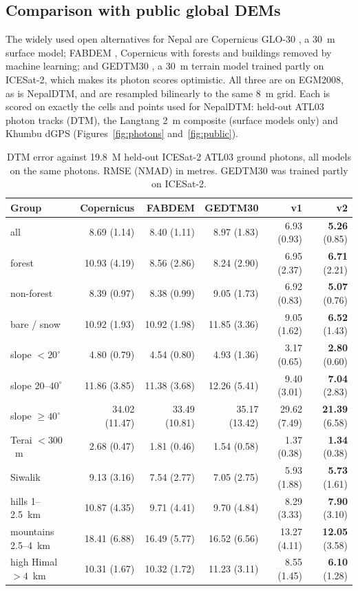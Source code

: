 \documentclass[11pt]{article}
\begin{document}
\subsection{Comparison with public global DEMs}
The widely used open alternatives for Nepal are Copernicus GLO-30 \citep{esa2021copernicus}, a 30~m surface
model; FABDEM \citep{hawker2022fabdem}, Copernicus with forests and buildings removed by machine learning; and
GEDTM30 \citep{ho2025gedtm30}, a 30~m terrain model trained partly on ICESat-2, which makes its photon scores
optimistic.
All three are on EGM2008, as is NepalDTM, and are resampled bilinearly to the same 8~m grid.
Each is scored on exactly the cells and points used for NepalDTM: held-out ATL03 photon tracks (DTM), the Langtang
2~m composite (surface models only) and Khumbu dGPS (Figures~\ref{fig:photons} and~\ref{fig:public}).
\begin{table}[!htbp]
\centering
\caption{DTM error against 19.8~M held-out ICESat-2 ATL03 ground photons, all models on the same photons.
RMSE (NMAD) in metres. GEDTM30 was trained partly on ICESat-2.}
\label{tab:photons}
\small
\begin{tabular}{lrrrrr}
\toprule
Group & Copernicus & FABDEM & GEDTM30 & v1 & \textbf{v2} \\
\midrule
all & 8.69 (1.14) & 8.40 (1.11) & 8.97 (1.83) & 6.93 (0.93) & \textbf{5.26} (0.85) \\
forest & 10.93 (4.19) & 8.56 (2.86) & 8.24 (2.90) & 6.95 (2.37) & \textbf{6.71} (2.21) \\
non-forest & 8.39 (0.97) & 8.38 (0.99) & 9.05 (1.73) & 6.92 (0.83) & \textbf{5.07} (0.76) \\
bare / snow & 10.92 (1.93) & 10.92 (1.98) & 11.85 (3.36) & 9.05 (1.62) & \textbf{6.52} (1.43) \\
slope $<20^\circ$ & 4.80 (0.79) & 4.54 (0.80) & 4.93 (1.36) & 3.17 (0.65) & \textbf{2.80} (0.60) \\
slope $20$--$40^\circ$ & 11.86 (3.85) & 11.38 (3.68) & 12.26 (5.41) & 9.40 (3.01) & \textbf{7.04} (2.83) \\
slope $\geq40^\circ$ & 34.02 (11.47) & 33.49 (10.81) & 35.17 (13.42) & 29.62 (7.49) & \textbf{21.39} (6.58) \\
Terai $<300$~m & 2.68 (0.47) & 1.81 (0.46) & 1.54 (0.58) & 1.37 (0.38) & \textbf{1.34} (0.38) \\
Siwalik & 9.13 (3.16) & 7.54 (2.77) & 7.05 (2.75) & 5.93 (1.88) & \textbf{5.73} (1.61) \\
hills 1--2.5~km & 10.87 (4.35) & 9.71 (4.41) & 9.70 (4.84) & 8.29 (3.33) & \textbf{7.90} (3.10) \\
mountains 2.5--4~km & 18.41 (6.88) & 16.49 (5.77) & 16.52 (6.56) & 13.27 (4.11) & \textbf{12.05} (3.58) \\
high Himal $>4$~km & 10.31 (1.67) & 10.32 (1.72) & 11.23 (3.11) & 8.55 (1.45) & \textbf{6.10} (1.28) \\
\bottomrule
\end{tabular}
\end{table}
\end{document}
